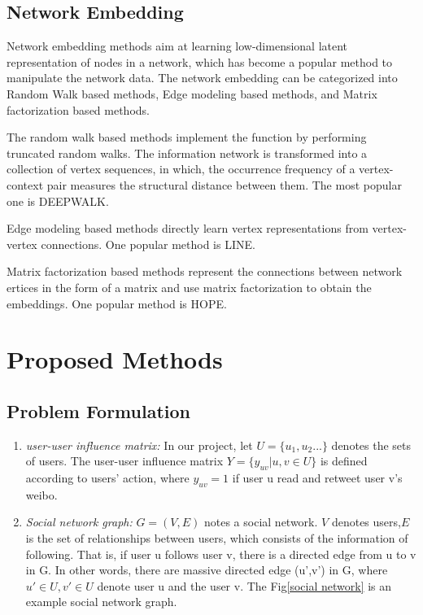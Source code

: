 \documentclass{acmtog} %
\begin{document}
\subsection{Network Embedding}
Network embedding methods aim at learning low-dimensional latent representation of nodes in a network, which has become a popular method to manipulate the network data. The network embedding can be categorized into Random Walk based methods, Edge modeling based methods, and Matrix factorization based methods.

The random walk based methods implement the function by performing truncated random walks. The information network is transformed into a collection of vertex sequences, in which, the occurrence frequency of a vertex-context pair measures the structural distance between them. The most popular one is DEEPWALK\cite{perozzi2014deepwalk}.

Edge modeling based methods directly learn vertex  representations from vertex-vertex connections. One popular method is LINE\cite{tang2015line}.

Matrix factorization based methods represent the connections between network ertices in the form of a matrix and use matrix factorization to obtain the embeddings. One popular method is HOPE\cite{ou2016asymmetric}.


\section{Proposed Methods}

\subsection{Problem Formulation}

\begin{enumerate}
    \item \emph{user-user influence matrix:} In our project, let $U=\{u_1,u_2 ...\}$ denotes the sets of users. The user-user influence matrix $Y=\{y_{uv}|u,v\in U\}$ is defined according to users' action, where $y_{uv}=1$ if user u read and retweet user v's weibo. 
    
    \item \emph{Social network graph:} $G = (V, E)$ notes a social network. $V$ denotes users,$E$ is the set of relationships between users, which consists of the information of following. That is, if user u follows user v, there is a directed edge from u to v in G. In other words, there are massive directed edge (u',v') in G, where $u'\in U, v'\in U$ denote user u and the user v. The Fig\ref{social network} is an example social network graph.
\end{enumerate} 
\end{document}
